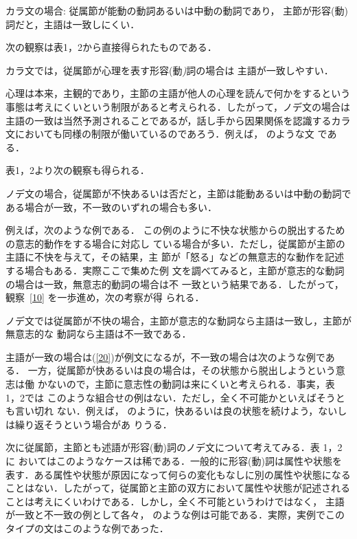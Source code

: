 \begin{obs}\label{5k}
{\dg カラ文の場合:}
従属節が能動の動詞あるいは中動の動詞であり，
主節が形容{\rm (}動{\rm )}詞だと，主語は一致しにくい．
\end{obs}

次の観察は表1，2から直接得られたものである．

\begin{obs}\label{01}
カラ文では，従属節が心理を表す形容{\rm (}動{\em )}詞の場合は
主語が一致しやすい．
\end{obs}

心理は本来，主観的であり，主節の主語が他人の心理を読んで何かをするという
事態は考えにくいという制限があると考えられる．したがって，ノデ文の場合は
主語の一致は当然予測されることであるが，話し手から因果関係を認識するカラ
文においても同様の制限が働いているのであろう．例えば，
のような文
である．

表1，2より次の観察も得られる．
\begin{obs}\label{10}
ノデ文の場合，従属節が不快あるいは否だと，主節は能動あるいは中動の動詞で
ある場合が一致，不一致のいずれの場合も多い．
\end{obs}
例えば，次のような例である．
この例のように不快な状態からの脱出するための意志的動作をする場合に対応し
ている場合が多い．ただし，従属節が主節の主語に不快を与えて，その結果，主
節が「怒る」などの無意志的な動作を記述する場合もある．実際ここで集めた例
文を調べてみると，主節が意志的な動詞の場合は一致，無意志的動詞の場合は不
一致という結果である．したがって，観察~\ref{10} を一歩進め，次の考察が得
られる．

\begin{kousatu}\label{30}
ノデ文では従属節が不快の場合，主節が意志的な動詞なら主語は一致し，主節が無意志的な
動詞なら主語は不一致である．
\end{kousatu}

主語が一致の場合は(\ref{20})が例文になるが，不一致の場合は次のような例である．
一方，従属節が快あるいは良の場合は，その状態から脱出しようという意志は働
かないので，主節に意志性の動詞は来にくいと考えられる．事実，表 1，2では
このような組合せの例はない．ただし，全く不可能かといえばそうとも言い切れ
ない．例えば，
のように，快あるいは良の状態を続けよう，ないしは繰り返そうという場合があ
りうる．

次に従属節，主節とも述語が形容(動)詞のノデ文について考えてみる．表 1，2に
おいてはこのようなケースは稀である．一般的に形容(動)詞は属性や状態を
表す．ある属性や状態が原因になって何らの変化もなしに別の属性や状態になる
ことはない．したがって，従属節と主節の双方において属性や状態が記述される
ことは考えにくいわけである．しかし，全く不可能というわけではなく，
主語が一致と不一致の例として各々，
のような例は可能である．実際，実例でこのタイプの文はこのような例であった．

